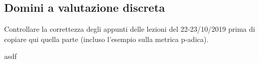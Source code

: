 \subsection{Domini a valutazione discreta}

Controllare la correttezza degli appunti delle lezioni del 22-23/10/2019 prima di copiare qui quella parte (incluso l'esempio sulla metrica p-adica).

asdf